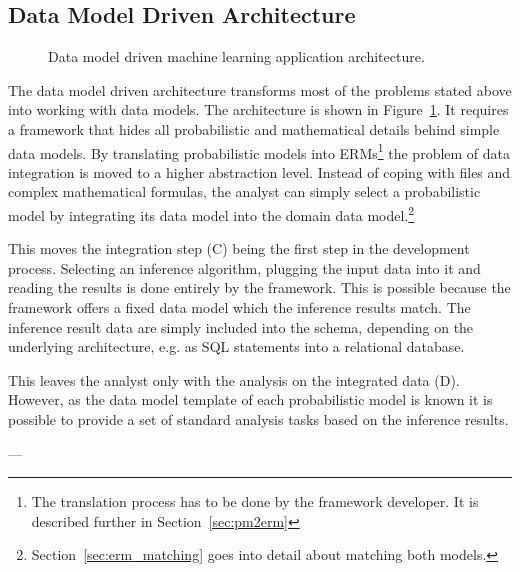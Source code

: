 \subsection{Data Model Driven Architecture}

\begin{figure}
\centering
\scalebox{\tikzScale}{\adjustTikzSize }
\caption{Data model driven machine learning application architecture.}\label{fig:ml-application-architecture-dm}
\end{figure}

The data model driven architecture transforms most of the problems stated above into working with data models. The architecture is shown in Figure~\ref{fig:ml-application-architecture-dm}. It requires a framework that hides all probabilistic and mathematical details behind simple data models. By translating probabilistic models into ERMs\footnote{The translation process has to be done by the framework developer. It is described further in Section~\ref{sec:pm2erm}} the problem of data integration is moved to a higher abstraction level. Instead of coping with files and complex mathematical formulas, the analyst can simply select a probabilistic model by integrating its data model into the domain data model.\footnote{Section~\ref{sec:erm_matching} goes into detail about matching both models.}

This moves the integration step (C) being the first step in the development process. Selecting an inference algorithm, plugging the input data into it and reading the results is done entirely by the framework. This is possible because the framework offers a fixed data model which the inference results match. The inference result data are simply included into the schema, depending on the underlying architecture, e.g. as SQL statements into a relational database.

This leaves the analyst only with the analysis on the integrated data (D). However, as the data model template of each probabilistic model is known it is possible to provide a set of standard analysis tasks based on the inference results.

---

